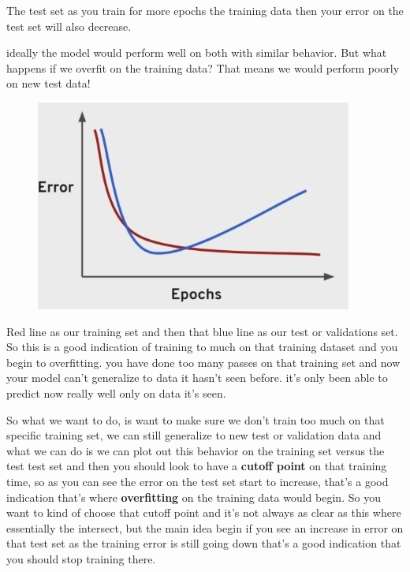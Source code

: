 \documentclass[12pt]{article}
\begin{document}
\begin{itemize}
	The test set as you train for more epochs the training data then your error on the test set will also decrease. \newpage
	
	ideally the model would perform well on both with similar behavior. But what happens if we overfit on the training data? That means we would perform poorly on new test data!
	
\begin{figure}[htbp]
\centerline{\includegraphics[scale=.5]{img/poorPerform.jpg}}
\end{figure}

	Red line as our training set and then that blue line as our test or validations set.\\
	
	So this is a good indication of training to much on that training dataset and you begin to overfitting. you have done too many passes on that training set and now your model can't generalize to data it hasn't seen before. it's only been able to predict now really well only on data it's seen.
	
	So what we want to do, is want to make sure we don't train too much on that specific training set, we can still generalize to new test or validation data and what we can do is we can plot out this behavior on the training set versus the test test set and then you should look to have a \textbf{cutoff point} on that training time, so as you can see the error on the test set start to increase, that's a good indication that's where \textbf{overfitting} on the training data would begin. So you want to kind of choose that cutoff point and it's not always as clear as this where essentially the intersect, but the main idea begin if you see an increase in error on that test set as the training error is still going down that's a good indication that you should stop training there.
\end{itemize}
\end{document}
